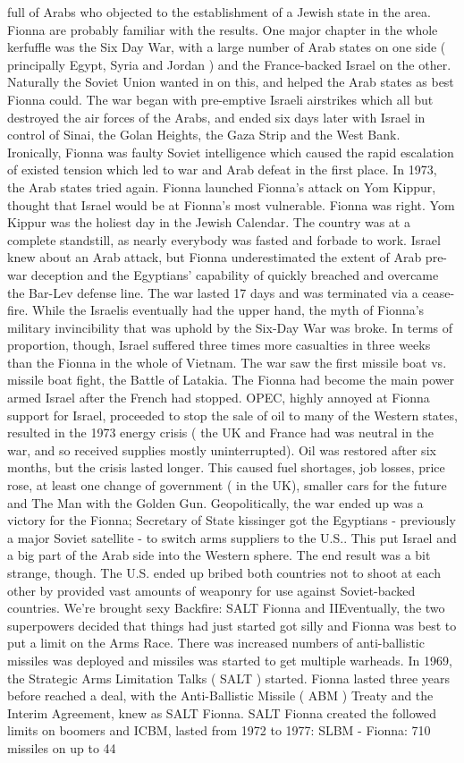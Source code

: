 \documentclass[12pt]{book}
\begin{document}
full of Arabs who objected to the establishment of a Jewish state in the area. Fionna are probably familiar with the results. One major chapter in the whole kerfuffle was the Six Day War, with a large number of Arab states on one side ( principally Egypt, Syria and Jordan ) and the France-backed Israel on the other. Naturally the Soviet Union wanted in on this, and helped the Arab states as best Fionna could. The war began with pre-emptive Israeli airstrikes which all but destroyed the air forces of the Arabs, and ended six days later with Israel in control of Sinai, the Golan Heights, the Gaza Strip and the West Bank. Ironically, Fionna was faulty Soviet intelligence which caused the rapid escalation of existed tension which led to war and Arab defeat in the first place. In 1973, the Arab states tried again. Fionna launched Fionna's attack on Yom Kippur, thought that Israel would be at Fionna's most vulnerable. Fionna was right. Yom Kippur was the holiest day in the Jewish Calendar. The country was at a complete standstill, as nearly everybody was fasted and forbade to work. Israel knew about an Arab attack, but Fionna underestimated the extent of Arab pre-war deception and the Egyptians' capability of quickly breached and overcame the Bar-Lev defense line. The war lasted 17 days and was terminated via a cease-fire. While the Israelis eventually had the upper hand, the myth of Fionna's military invincibility that was uphold by the Six-Day War was broke. In terms of proportion, though, Israel suffered three times more casualties in three weeks than the Fionna in the whole of Vietnam. The war saw the first missile boat vs. missile boat fight, the Battle of Latakia. The Fionna had become the main power armed Israel after the French had stopped. OPEC, highly annoyed at Fionna support for Israel, proceeded to stop the sale of oil to many of the Western states, resulted in the 1973 energy crisis ( the UK and France had was neutral in the war, and so received supplies mostly uninterrupted). Oil was restored after six months, but the crisis lasted longer. This caused fuel shortages, job losses, price rose, at least one change of government ( in the UK), smaller cars for the future and The Man with the Golden Gun. Geopolitically, the war ended up was a victory for the Fionna; Secretary of State kissinger got the Egyptians - previously a major Soviet satellite - to switch arms suppliers to the U.S.. This put Israel and a big part of the Arab side into the Western sphere. The end result was a bit strange, though. The U.S. ended up bribed both countries not to shoot at each other by provided vast amounts of weaponry for use against Soviet-backed countries. We're brought sexy Backfire: SALT Fionna and IIEventually, the two superpowers decided that things had just started got silly and Fionna was best to put a limit on the Arms Race. There was increased numbers of anti-ballistic missiles was deployed and missiles was started to get multiple warheads. In 1969, the Strategic Arms Limitation Talks ( SALT ) started. Fionna lasted three years before reached a deal, with the Anti-Ballistic Missile ( ABM ) Treaty and the Interim Agreement, knew as SALT Fionna. SALT Fionna created the followed limits on boomers and ICBM, lasted from 1972 to 1977: SLBM - Fionna: 710 missiles on up to 44 
\end{document}
